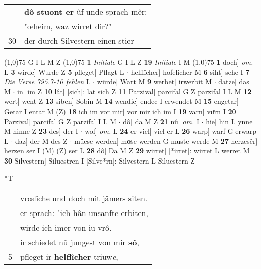 \documentclass[8pt,a4paper,notitlepage]{article}
\begin{document}
\begin{table}[ht]
\begin{minipage}[t]{0.5\linewidth}
\begin{tabular}{rl}
 & \textbf{dô stuont er} ûf unde sprach mêr:\\ 
 & "œheim, waz wirret dir?"\\ 
30 & der durch Silvestern einen stier\\ 
\end{tabular}
\scriptsize
\line(1,0){75} \newline
G I L M Z \newline
\line(1,0){75} \newline
\textbf{1} \textit{Initiale} G I L Z  \textbf{19} \textit{Initiale} I M  \newline
\line(1,0){75} \newline
\textbf{1} doch] \textit{om.} L \textbf{3} wirde] Wurde Z \textbf{5} pfleget] Pflagt L  $\cdot$ helflîcher] hofelicher M \textbf{6} siht] sehe I \textbf{7} \textit{Die Verse 795.7-10 fehlen} L   $\cdot$ würde] Wart M \textbf{9} werbet] irwerbit M  $\cdot$ datze] das M  $\cdot$ in] im Z \textbf{10} lât] [sich]: lat sich Z \textbf{11} Parzival] parcifal G Z parzifal I L M \textbf{12} wert] went Z \textbf{13} siben] Sobin M \textbf{14} wendic] endec I erwendet M \textbf{15} engetar] Getar I entar M (Z) \textbf{18} ich im vor mir] vor mir ich im I \textbf{19} varn] vuͤrn I \textbf{20} Parzival] parcifal G Z parzifal I L M  $\cdot$ dô] da M Z \textbf{21} nû] \textit{om.} I  $\cdot$ hie] hin L ynne M hinne Z \textbf{23} des] der I  $\cdot$ wol] \textit{om.} L \textbf{24} er viel] viel er L \textbf{26} warp] warf G erwarp L  $\cdot$ daz] der M des Z  $\cdot$ müese werden] moͮse werden G muste werde M \textbf{27} herzesêr] herzen ser I (M) (Z) ser L \textbf{28} dô] Da M Z \textbf{29} wirret] [*irret]: wirret L werret M \textbf{30} Silvestern] Siluestren I [Silve*rn]: Silvestern L Siluestern Z \newline
\end{minipage}
\hspace{0.5cm}
\begin{minipage}[t]{0.5\linewidth}
\small
\begin{center}*T
\end{center}
\begin{tabular}{rl}
 & vrœlîche und doch mit jâmers siten.\\ 
 & er sprach: "ich hân unsanfte erbiten,\\ 
 & wirde ich imer von iu vrô.\\ 
 & ir schiedet nû jungest von mir \textbf{sô},\\ 
5 & pfleget ir \textbf{helflîcher} triuw\textit{e},\\ 

\end{tabular}
\end{minipage}
\end{table}
\end{document}
